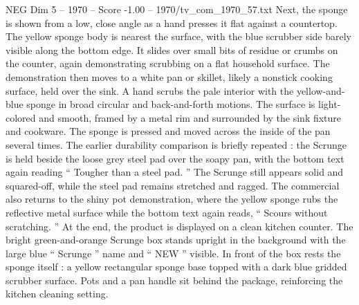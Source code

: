 \begin{textsample}{NEG Dim 5 – 1970 – Score -1.00 – 1970/tv\_com\_1970\_57.txt}
Next, the sponge is shown from a low, close angle as a hand presses it flat against a countertop.
The yellow sponge body is nearest the surface, with the blue scrubber side barely visible along the bottom edge.
It slides over small bits of residue or crumbs on the counter, again demonstrating scrubbing on a flat household surface.
The demonstration then moves to a white pan or skillet, likely a nonstick cooking surface, held over the sink.
A hand scrubs the pale interior with the yellow-and-blue sponge in broad circular and back-and-forth motions.
The surface is light-colored and smooth, framed by a metal rim and surrounded by the sink fixture and cookware.
The sponge is pressed and moved across the inside of the pan several times.
The earlier durability comparison is briefly repeated : the Scrunge is held beside the loose grey steel pad over the soapy pan, with the bottom text again reading “ Tougher than a steel pad. ” The Scrunge still appears solid and squared-off, while the steel pad remains stretched and ragged.
The commercial also returns to the shiny pot demonstration, where the yellow sponge rubs the reflective metal surface while the bottom text again reads, “ Scours without scratching. ” At the end, the product is displayed on a clean kitchen counter.
The bright green-and-orange Scrunge box stands upright in the background with the large blue “ Scrunge ” name and “ NEW ” visible.
In front of the box rests the sponge itself : a yellow rectangular sponge base topped with a dark blue gridded scrubber surface.
Pots and a pan handle sit behind the package, reinforcing the kitchen cleaning setting.

\end{textsample}
